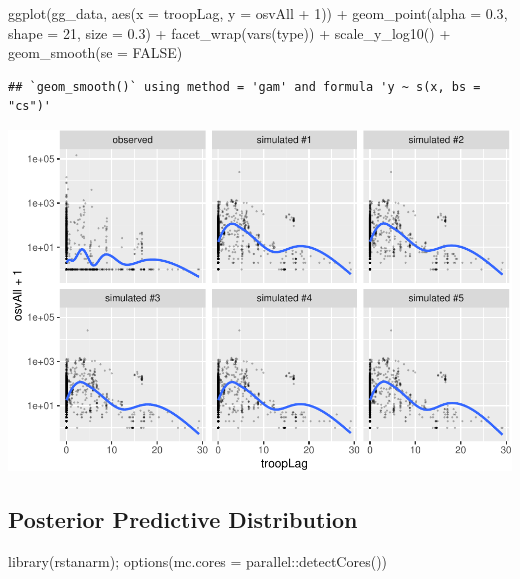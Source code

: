 \documentclass[
]{book}
\newenvironment{Shaded}{\begin{snugshade}}{\end{snugshade}}
\newcommand{\AttributeTok}[1]{\textcolor[rgb]{0.77,0.63,0.00}{#1}}
\newcommand{\ConstantTok}[1]{\textcolor[rgb]{0.00,0.00,0.00}{#1}}
\newcommand{\DecValTok}[1]{\textcolor[rgb]{0.00,0.00,0.81}{#1}}
\newcommand{\FloatTok}[1]{\textcolor[rgb]{0.00,0.00,0.81}{#1}}
\newcommand{\FunctionTok}[1]{\textcolor[rgb]{0.00,0.00,0.00}{#1}}
\newcommand{\NormalTok}[1]{#1}
\newcommand{\SpecialCharTok}[1]{\textcolor[rgb]{0.00,0.00,0.00}{#1}}
\begin{document}
\begin{Shaded}
\begin{Highlighting}[]
\FunctionTok{ggplot}\NormalTok{(gg\_data, }\FunctionTok{aes}\NormalTok{(}\AttributeTok{x =}\NormalTok{ troopLag, }\AttributeTok{y =}\NormalTok{ osvAll }\SpecialCharTok{+} \DecValTok{1}\NormalTok{)) }\SpecialCharTok{+} 
  \FunctionTok{geom\_point}\NormalTok{(}\AttributeTok{alpha =} \FloatTok{0.3}\NormalTok{, }\AttributeTok{shape =} \DecValTok{21}\NormalTok{, }\AttributeTok{size =} \FloatTok{0.3}\NormalTok{) }\SpecialCharTok{+} 
  \FunctionTok{facet\_wrap}\NormalTok{(}\FunctionTok{vars}\NormalTok{(type)) }\SpecialCharTok{+} 
  \FunctionTok{scale\_y\_log10}\NormalTok{() }\SpecialCharTok{+} 
  \FunctionTok{geom\_smooth}\NormalTok{(}\AttributeTok{se =} \ConstantTok{FALSE}\NormalTok{)}
\end{Highlighting}
\end{Shaded}

\begin{verbatim}
## `geom_smooth()` using method = 'gam' and formula 'y ~ s(x, bs = "cs")'
\end{verbatim}

\includegraphics{03-03-poisson-model_files/figure-latex/unnamed-chunk-4-2.pdf}

\hypertarget{posterior-predictive-distribution}{%
\subsection{Posterior Predictive
Distribution}\label{posterior-predictive-distribution}}

\begin{Shaded}
\begin{Highlighting}[]
\FunctionTok{library}\NormalTok{(rstanarm); }\FunctionTok{options}\NormalTok{(}\AttributeTok{mc.cores =}\NormalTok{ parallel}\SpecialCharTok{::}\FunctionTok{detectCores}\NormalTok{())}
\end{Highlighting}
\end{Shaded}
\end{document}
